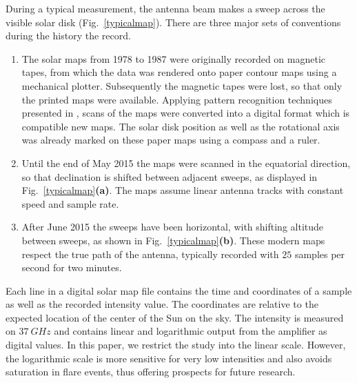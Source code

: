 \documentclass{aa}
\begin{document}
  During a typical measurement, the antenna beam makes a sweep across the
  visible solar disk (Fig.~\ref{typicalmap}). There are three major sets of conventions during the history the record.
  \begin{enumerate}[A]
    \item
    The solar maps from 1978 to 1987 were originally recorded on magnetic
    tapes, from which the data was rendered onto paper contour maps using a
    mechanical plotter.
    Subsequently the magnetic tapes were lost, so that only the printed maps
    were available. Applying pattern recognition techniques presented in \cite{masterthesis}, scans of the maps were converted into
    a digital format which is compatible new maps.
    The solar disk position as well as the rotational axis was already marked on these paper maps using a compass and a ruler.
    \item
    Until the end of May 2015 the maps were scanned in the equatorial direction,
    so that declination is shifted between adjacent sweeps, as displayed in
    Fig.~\ref{typicalmap}{\bf(a)}.
    The maps assume linear antenna tracks with constant speed and sample rate.
    \item
    After June 2015 the sweeps have been horizontal, with shifting altitude
    between sweeps, as shown in Fig.~\ref{typicalmap}{\bf(b)}.
    These modern maps respect the true path of the antenna, typically recorded
    with $25$ samples per second for two minutes.
  \end{enumerate}

Each line in a digital solar map file contains the time and coordinates of a sample as well as the recorded intensity 
value. The coordinates are relative to the expected location of the center of the Sun on the sky. The intensity is 
measured on $\SI{37}{GHz}$ and contains linear and logarithmic output from the amplifier as digital values. In this 
paper, we restrict the study into the linear scale. However, the logarithmic scale is more sensitive for very low 
intensities and also avoids saturation in flare events, thus offering prospects for future 
research.
\end{document}
